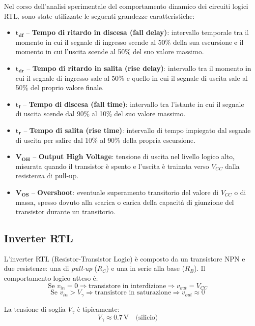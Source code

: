 \documentclass[a4paper,12pt]{article}
\begin{document}
Nel corso dell’analisi sperimentale del comportamento dinamico dei circuiti logici RTL, sono state utilizzate le seguenti grandezze caratteristiche:

\begin{itemize}
    \item \(\mathbf{t_{df}}\) – \textbf{Tempo di ritardo in discesa (fall delay)}: intervallo temporale tra il momento in cui il segnale di ingresso scende al 50\% della sua escursione e il momento in cui l’uscita scende al 50\% del suo valore massimo.
    \item \(\mathbf{t_{dr}}\) – \textbf{Tempo di ritardo in salita (rise delay)}: intervallo tra il momento in cui il segnale di ingresso sale al 50\% e quello in cui il segnale di uscita sale al 50\% del proprio valore finale.
    \item \(\mathbf{t_f}\) – \textbf{Tempo di discesa (fall time)}: intervallo tra l’istante in cui il segnale di uscita scende dal 90\% al 10\% del suo valore massimo.
    \item \(\mathbf{t_r}\) – \textbf{Tempo di salita (rise time)}: intervallo di tempo impiegato dal segnale di uscita per salire dal 10\% al 90\% della propria escursione.
    \item \(\mathbf{V_{OH}}\) – \textbf{Output High Voltage}: tensione di uscita nel livello logico alto, misurata quando il transistor è spento e l’uscita è trainata verso \(V_{CC}\) dalla resistenza di pull-up.
    \item \(\mathbf{V_{OS}}\) – \textbf{Overshoot}: eventuale superamento transitorio del valore di \(V_{CC}\) o di massa, spesso dovuto alla scarica o carica della capacità di giunzione del transistor durante un transitorio.
\end{itemize}
\subsection{Inverter RTL}

L’inverter RTL (Resistor-Transistor Logic) è composto da un transistore NPN e due resistenze: una di \textit{pull-up} (\(R_C\)) e una in serie alla base (\(R_B\)). Il comportamento logico atteso è:
\[
\text{Se } v_{in} = 0 \Rightarrow \text{transistore in interdizione} \Rightarrow v_{out} = V_{CC}
\]
\[
\text{Se } v_{in} > V_{\gamma} \Rightarrow \text{transistore in saturazione} \Rightarrow v_{out} \approx 0
\]

La tensione di soglia \(V_{\gamma}\) è tipicamente:
\[
V_{\gamma} \approx 0.7\,\mathrm{V} \quad \text{(silicio)}
\]
\end{document}
